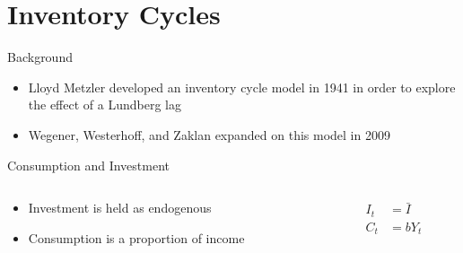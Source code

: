 \documentclass{beamer}
\begin{document}
\section*{Inventory Cycles}
\begin{frame}{Background}
	\begin{itemize}
		\item Lloyd Metzler developed an inventory cycle model in 1941 in order to explore the effect of a Lundberg lag\autocite{Metzler1941}
		\item Wegener, Westerhoff, and Zaklan expanded on this model in 2009\autocite{Wegener2009}
	\end{itemize}
\end{frame}
\begin{frame}{Consumption and Investment}
	\begin{columns}
	\begin{column}{0.5\textwidth}
		\begin{itemize}
			\item Investment is held as endogenous 
			\item Consumption is a proportion of income
		\end{itemize}
	\end{column}
	\begin{column}{0.5\textwidth}
		\begin{align*}
			I_t &= \bar I\\
			C_t &= bY_t
		\end{align*}
	\end{column}
	\end{columns}
\end{frame}
\end{document}
